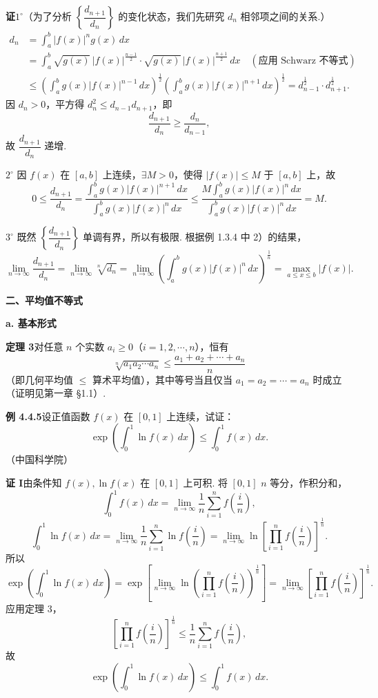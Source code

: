 \documentclass[UTF8,12pt,a4paper,fontset=fandol]{ctexart}
\begin{document}
\noindent\textbf{证}\quad $1^\circ$（为了分析 $\left\{\dfrac{d_{n+1}}{d_n}\right\}$ 的变化状态，我们先研究 $d_n$ 相邻项之间的关系.）
\[
\begin{aligned}
d_n&=\int_a^b |f(x)|^n g(x)\,dx\\
&=\int_a^b \sqrt{g(x)}\,|f(x)|^{\frac{n-1}{2}}\cdot
\sqrt{g(x)}\,|f(x)|^{\frac{n+1}{2}}\,dx\quad(\text{应用 Schwarz 不等式})\\
&\le\left(\int_a^b g(x)|f(x)|^{n-1}\,dx\right)^{\frac12}
\left(\int_a^b g(x)|f(x)|^{n+1}\,dx\right)^{\frac12}
=d_{n-1}^{\frac12}\cdot d_{n+1}^{\frac12}.
\end{aligned}
\]
因 $d_n>0$，平方得 $d_n^2\le d_{n-1}d_{n+1}$，即
\[
\frac{d_{n+1}}{d_n}\ge\frac{d_n}{d_{n-1}},
\]
故 $\dfrac{d_{n+1}}{d_n}$ 递增.

$2^\circ$ 因 $f(x)$ 在 $[a,b]$ 上连续，$\exists M>0$，使得 $|f(x)|\le M$ 于 $[a,b]$ 上，故
\[
0\le\frac{d_{n+1}}{d_n}
=\frac{\int_a^b g(x)|f(x)|^{n+1}\,dx}{\int_a^b g(x)|f(x)|^n\,dx}
\le \frac{M\int_a^b g(x)|f(x)|^n\,dx}{\int_a^b g(x)|f(x)|^n\,dx}=M.
\]

$3^\circ$ 既然 $\left\{\dfrac{d_{n+1}}{d_n}\right\}$ 单调有界，所以有极限. 根据例 1.3.4 中 2）的结果，
\[
\lim_{n\to\infty}\frac{d_{n+1}}{d_n}
=\lim_{n\to\infty}\sqrt[n]{d_n}
=\lim_{n\to\infty}\left(\int_a^b g(x)|f(x)|^n\,dx\right)^{\frac1n}
=\max_{a\le x\le b}|f(x)|.
\]

\noindent\textbf{二、平均值不等式}

\noindent\textbf{a. 基本形式}

\noindent\textbf{定理 3}\quad 对任意 $n$ 个实数 $a_i\ge0$（$i=1,2,\cdots,n$），恒有
\[
\sqrt[n]{a_1a_2\cdots a_n}\le \frac{a_1+a_2+\cdots+a_n}{n} \tag{1}
\]
（即几何平均值 $\le$ 算术平均值），其中等号当且仅当 $a_1=a_2=\cdots=a_n$ 时成立（证明见第一章 §1.1）.

\noindent\textbf{例 4.4.5}\quad 设正值函数 $f(x)$ 在 $[0,1]$ 上连续，试证：
\[
\exp\left(\int_0^1\ln f(x)\,dx\right)\le\int_0^1 f(x)\,dx.
\]
（中国科学院）

\noindent\textbf{证 I}\quad 由条件知 $f(x),\ln f(x)$ 在 $[0,1]$ 上可积. 将 $[0,1]$ $n$ 等分，作积分和，
\[
\int_0^1 f(x)\,dx=\lim_{n\to\infty}\frac1n\sum_{i=1}^n f\left(\frac in\right),
\]
\[
\int_0^1\ln f(x)\,dx
=\lim_{n\to\infty}\frac1n\sum_{i=1}^n\ln f\left(\frac in\right)
=\lim_{n\to\infty}\ln\left[\prod_{i=1}^n f\left(\frac in\right)\right]^{\frac1n}.
\]
所以
\[
\exp\left(\int_0^1\ln f(x)\,dx\right)
=\exp\left[\lim_{n\to\infty}\ln\left(\prod_{i=1}^n f\left(\frac in\right)\right)^{\frac1n}\right]
=\lim_{n\to\infty}\left[\prod_{i=1}^n f\left(\frac in\right)\right]^{\frac1n}.
\]
应用定理 3，
\[
\left[\prod_{i=1}^n f\left(\frac in\right)\right]^{\frac1n}
\le\frac1n\sum_{i=1}^n f\left(\frac in\right),
\]
故
\[
\exp\left(\int_0^1\ln f(x)\,dx\right)\le\int_0^1 f(x)\,dx.
\]
\end{document}
